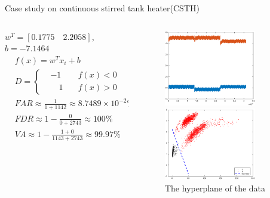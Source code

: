 \documentclass[10pt]{beamer}
\begin{document}
\begin{frame}{Case study on continuous stirred tank heater(CSTH)}
     \begin{columns}
             \begin{column}{0.5\textwidth}
 $w^T = [0.1775 \quad 2.2058]$,$b = -7.1464$
 \begin{equation} \nonumber
  \begin{aligned}
  & f(x) =  
 w^Tx_i+b  \\
  & D = \left\{
     \begin{aligned}
      &-1\quad &f(x)<0 \quad &\text{(fault-free)}  \\
      &\quad 1    \quad &f(x)>0 \quad &\text{(faulty)}
     \end{aligned}
  \right. 
    \end{aligned}
\end{equation}
\begin{equation} \nonumber
  \begin{aligned}
   & FAR \approx \frac{1}{1+1142} \approx  8.7489\times 10^{-2} \% \\
   & FDR \approx 1 - \frac{0}{0+2743} \approx 100 \% \\
   & VA \approx 1 - \frac{1+0}{1143+2743} \approx 99.97 \% 
  \end{aligned}
\end{equation}
           \end{column}
        \begin{column}{0.5\textwidth}  %
   \begin{figure}
        \centering
        \includegraphics[width=4cm]{fig/csthrealdata.eps}
        \caption{real data from CSTH}
        \includegraphics[width=4cm]{fig/Csthboundary.eps}
        \caption{The hyperplane of the data}
        \end{figure}
  
        \end{column}
    \end{columns}
\end{frame}
\end{document}
